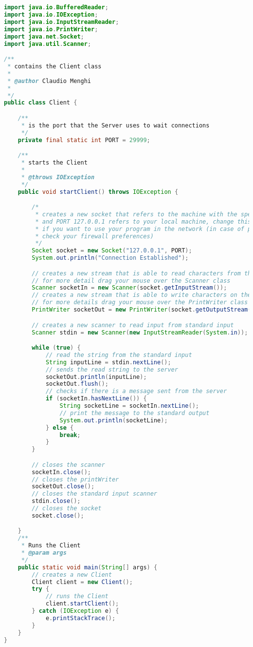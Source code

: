 \documentclass{article}
\begin{document}
\begin{lstlisting}[language=Java,escapechar=|]


import java.io.BufferedReader;
import java.io.IOException;
import java.io.InputStreamReader;
import java.io.PrintWriter;
import java.net.Socket;
import java.util.Scanner;

/**
 * contains the Client class
 * 
 * @author Claudio Menghi
 * 
 */
public class Client {

	/**
	 * is the port that the Server uses to wait connections
	 */
	private final static int PORT = 29999;

	/**
	 * starts the Client
	 * 
	 * @throws IOException
	 */
	public void startClient() throws IOException {

		/*
		 * creates a new socket that refers to the machine with the specified IP
		 * and PORT 127.0.0.1 refers to your local machine, change this address
		 * if you want to use your program in the network (in case of problems
		 * check your firewall preferences)
		 */
		Socket socket = new Socket("127.0.0.1", PORT);
		System.out.println("Connection Established");

		// creates a new stream that is able to read characters from the socket
		// for more detail drag your mouse over the Scanner class
		Scanner socketIn = new Scanner(socket.getInputStream());
		// creates a new stream that is able to write characters on the socket
		// for more details drag your mouse over the PrintWriter class
		PrintWriter socketOut = new PrintWriter(socket.getOutputStream());

		// creates a new scanner to read input from standard input
		Scanner stdin = new Scanner(new InputStreamReader(System.in));

		while (true) {
			// read the string from the standard input
			String inputLine = stdin.nextLine();
			// sends the read string to the server
			socketOut.println(inputLine);
			socketOut.flush();
			// checks if there is a message sent from the server
			if (socketIn.hasNextLine()) {
				String socketLine = socketIn.nextLine();
				// print the message to the standard output
				System.out.println(socketLine);
			} else {
				break;
			}
		}

		// closes the scanner
		socketIn.close();
		// closes the printWriter
		socketOut.close();
		// closes the standard input scanner
		stdin.close();
		// closes the socket
		socket.close();

	}
	/**
	 * Runs the Client 
	 * @param args
	 */
	public static void main(String[] args) {
		// creates a new Client
		Client client = new Client();
		try {
			// runs the Client
			client.startClient();
		} catch (IOException e) {
			e.printStackTrace();
		}
	}
}
\end{lstlisting}
\end{document}
